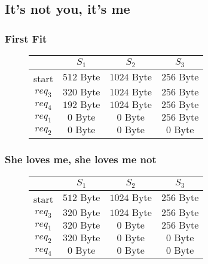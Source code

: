 \documentclass[a4paper, 11pt]{article}
\begin{document}
\subsection{It's not you, it's me}
\subsubsection{First Fit}
\begin{figure}[h]
      \centering
      \begin{tabular}{|c|c|c|c|}
        \hline
        &$S_1$&$S_2$&$S_3$\\\hline
        start&$512 \mbox{ Byte}$&$1024 \mbox{ Byte}$&$256 \mbox{ Byte}$\\
        $req_3$&$320 \mbox{ Byte}$&$1024 \mbox{ Byte}$&$256 \mbox{ Byte}$\\
        $req_4$&$192 \mbox{ Byte}$&$1024 \mbox{ Byte}$&$256 \mbox{ Byte}$\\
        $req_1$&$0 \mbox{ Byte}$&$0 \mbox{ Byte}$&$256 \mbox{ Byte}$\\
        $req_2$&$0 \mbox{ Byte}$&$0 \mbox{ Byte}$&$0 \mbox{ Byte}$\\\hline
  
      \end{tabular}
\end{figure}

\subsubsection{She loves me, she loves me not}
\begin{figure}[h]
      \centering
      \begin{tabular}{|c|c|c|c|}
        \hline
        &$S_1$&$S_2$&$S_3$\\\hline
        start&$512 \mbox{ Byte}$&$1024 \mbox{ Byte}$&$256 \mbox{ Byte}$\\
        $req_3$&$320 \mbox{ Byte}$&$1024 \mbox{ Byte}$&$256 \mbox{ Byte}$\\
        $req_1$&$320 \mbox{ Byte}$&$0 \mbox{ Byte}$&$256 \mbox{ Byte}$\\
        $req_2$&$320 \mbox{ Byte}$&$0 \mbox{ Byte}$&$0 \mbox{ Byte}$\\
        $req_4$&$0 \mbox{ Byte}$&$0 \mbox{ Byte}$&$0 \mbox{ Byte}$\\\hline
  
      \end{tabular}
\end{figure}
\end{document}
